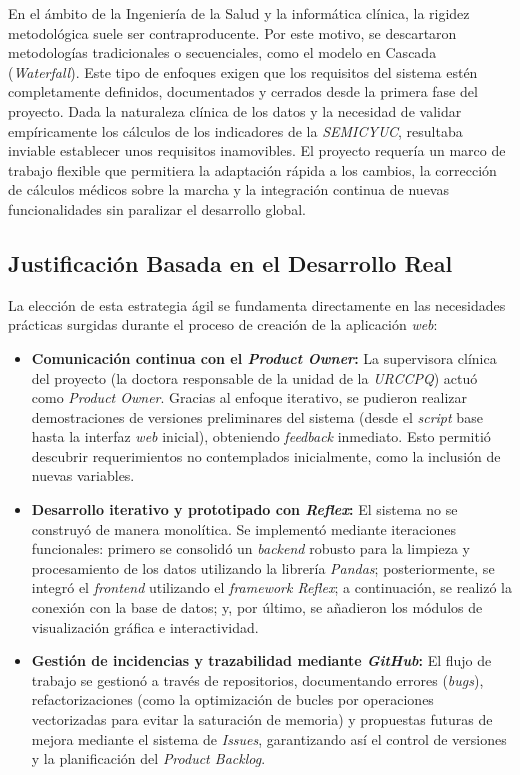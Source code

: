 En el ámbito de la Ingeniería de la Salud y la informática clínica, la rigidez metodológica suele ser contraproducente. Por este motivo, se descartaron metodologías tradicionales o secuenciales, como el modelo en Cascada (\textit{Waterfall}). Este tipo de enfoques exigen que los requisitos del sistema estén completamente definidos, documentados y cerrados desde la primera fase del proyecto. Dada la naturaleza clínica de los datos y la necesidad de validar empíricamente los cálculos de los indicadores de la \textit{SEMICYUC}, resultaba inviable establecer unos requisitos inamovibles. El proyecto requería un marco de trabajo flexible que permitiera la adaptación rápida a los cambios, la corrección de cálculos médicos sobre la marcha y la integración continua de nuevas funcionalidades sin paralizar el desarrollo global.

\subsection{Justificación Basada en el Desarrollo Real}
La elección de esta estrategia ágil se fundamenta directamente en las necesidades prácticas surgidas durante el proceso de creación de la aplicación \textit{web}:

\begin{itemize}
    \item \textbf{Comunicación continua con el \textit{Product Owner}:} La supervisora clínica del proyecto (la doctora responsable de la unidad de la \textit{URCCPQ}) actuó como \textit{Product Owner}. Gracias al enfoque iterativo, se pudieron realizar demostraciones de versiones preliminares del sistema (desde el \textit{script} base hasta la interfaz \textit{web} inicial), obteniendo \textit{feedback} inmediato. Esto permitió descubrir requerimientos no contemplados inicialmente, como la inclusión de nuevas variables.
    \item \textbf{Desarrollo iterativo y prototipado con \textit{Reflex}:} El sistema no se construyó de manera monolítica. Se implementó mediante iteraciones funcionales: primero se consolidó un \textit{backend} robusto para la limpieza y procesamiento de los datos utilizando la librería \textit{Pandas}; posteriormente, se integró el \textit{frontend} utilizando el \textit{framework Reflex}; a continuación, se realizó la conexión con la base de datos; y, por último, se añadieron los módulos de visualización gráfica e interactividad.
    \item \textbf{Gestión de incidencias y trazabilidad mediante \textit{GitHub}:} El flujo de trabajo se gestionó a través de repositorios, documentando errores (\textit{bugs}), refactorizaciones (como la optimización de bucles por operaciones vectorizadas para evitar la saturación de memoria) y propuestas futuras de mejora mediante el sistema de \textit{Issues}, garantizando así el control de versiones y la planificación del \textit{Product Backlog}.
\end{itemize}

